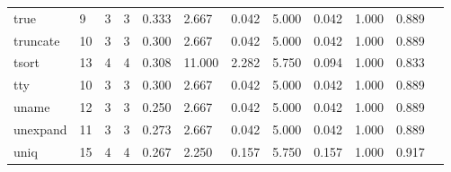 \begin{longtable}{lp{1.00cm}p{1.00cm}p{1.00cm}p{1.00cm}p{1.00cm}p{1.00cm}p{1.00cm}p{1.00cm}p{1.00cm}p{1.00cm}p{1.00cm}}
true      &                            9 &                  3 &                                 3 &                                      0.333 &                                  2.667 &                                        0.042 &                             5.000 &                                   0.042 &                        1.000 &                                        0.889 \\
truncate  &                           10 &                  3 &                                 3 &                                      0.300 &                                  2.667 &                                        0.042 &                             5.000 &                                   0.042 &                        1.000 &                                        0.889 \\
tsort     &                           13 &                  4 &                                 4 &                                      0.308 &                                 11.000 &                                        2.282 &                             5.750 &                                   0.094 &                        1.000 &                                        0.833 \\
tty       &                           10 &                  3 &                                 3 &                                      0.300 &                                  2.667 &                                        0.042 &                             5.000 &                                   0.042 &                        1.000 &                                        0.889 \\
uname     &                           12 &                  3 &                                 3 &                                      0.250 &                                  2.667 &                                        0.042 &                             5.000 &                                   0.042 &                        1.000 &                                        0.889 \\
unexpand  &                           11 &                  3 &                                 3 &                                      0.273 &                                  2.667 &                                        0.042 &                             5.000 &                                   0.042 &                        1.000 &                                        0.889 \\
uniq      &                           15 &                  4 &                                 4 &                                      0.267 &                                  2.250 &                                        0.157 &                             5.750 &                                   0.157 &                        1.000 &                                        0.917 \\

\end{longtable}
